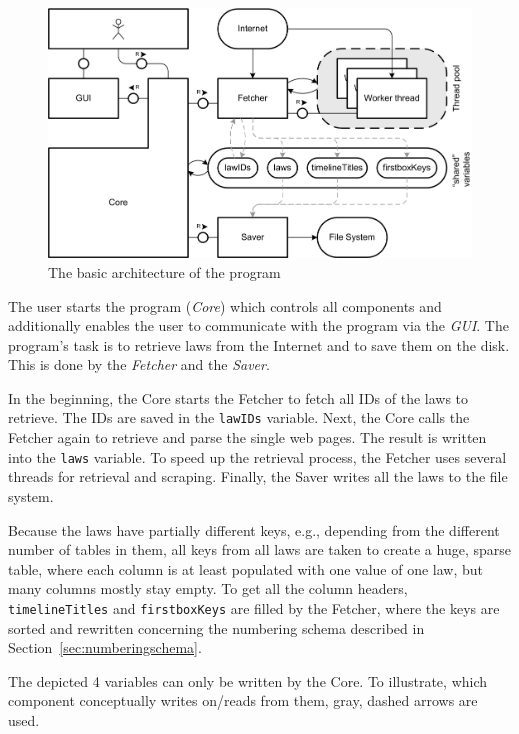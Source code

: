 \documentclass{scrartcl}
\begin{document}
\begin{figure}[ht]
\begin{center}
\includegraphics[width = \textwidth]{Architecture.png}
\caption{The basic architecture of the program}
\label{Architecture}
\end{center}
\end{figure}

The user starts the program (\textit{Core}) which controls all components and additionally enables the user to communicate with the program via the \textit{GUI}. The program's task is to retrieve laws from the Internet and to save them on the disk. This is done by the \textit{Fetcher} and the \textit{Saver}.

In the beginning, the Core starts the Fetcher to fetch all IDs of the laws to retrieve. The IDs are saved in the \texttt{lawIDs} variable. Next, the Core calls the Fetcher again to retrieve and parse the single web pages. The result is written into the \texttt{laws} variable. To speed up the retrieval process, the Fetcher uses several threads for retrieval and scraping. Finally, the Saver writes all the laws to the file system.

Because the laws have partially different keys, e.g., depending from the different number of tables in them, all keys from all laws are taken to create a huge, sparse table, where each column is at least populated with one value of one law, but many columns mostly stay empty. To get all the column headers, \texttt{timelineTitles} and \texttt{firstboxKeys} are filled by the Fetcher, where the keys are sorted and rewritten concerning the numbering schema described in Section~\ref{sec:numberingschema}.

The depicted 4 variables can only be written by the Core. To illustrate, which component conceptually writes on/reads from them, gray, dashed arrows are used.
\end{document}
